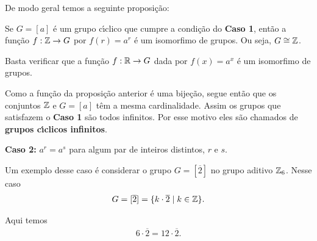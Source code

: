 De modo geral temos a seguinte proposi\c{c}\~ao:

\begin{proposicao}
    Se $G = [a]$ \'e um grupo c{\'\i}clico que cumpre a condi\c{c}\~ao do \textbf{Caso 1}, ent\~ao a fun\c{c}\~ao $f : \mathbb{Z} \to G$ por $f(r) = a^r$ \'e um isomorfimo de grupos. Ou seja, $G \cong \mathbb{Z}$.
\end{proposicao}
\begin{prova}
	Basta verificar que a fun\c{c}\~ao $f : \mathbb{R} \to G$ dada por $f(x) = a^x$ \'e um isomorfimo de grupos.
\end{prova}

\begin{observacao}
	Como a fun\c{c}\~ao da proposi\c{c}\~ao anterior \'e uma bije\c{c}\~ao, segue ent\~ao que os conjuntos $\mathbb{Z}$ e $G = [a]$ t\^em a mesma cardinalidade. Assim os grupos que satisfazem o \textbf{Caso 1} s\~ao todos infinitos. Por esse motivo eles s\~ao chamados de \textbf{grupos c{\'\i}clicos infinitos}.
\end{observacao}

\textbf{Caso 2:} $a^r = a^s$ para algum par de inteiros distintos, $r$ e $s$.

Um exemplo desse caso \'e considerar o grupo $G = [\overline{2}]$ no grupo aditivo $\mathbb{Z}_6$. Nesse caso
\begin{align*}
	G = [\overline{2}] = \{k \cdot \overline{2} \mid k \in \mathbb{Z}\}.
\end{align*}

Aqui temos
\begin{align*}
	6\cdot\overline{2} = 12\cdot \overline{2}.
\end{align*}

